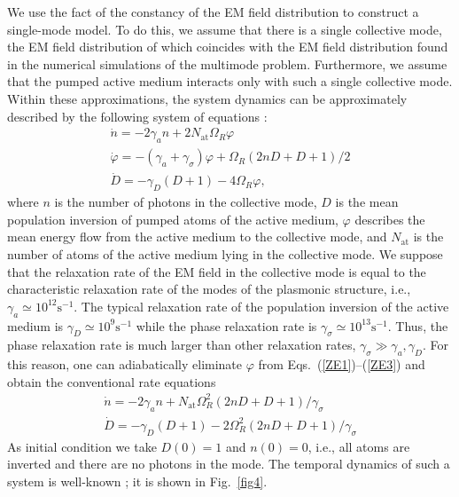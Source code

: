 \documentclass[aps,pra,amsmath,amssymb,onecolumn,superscriptaddress,showpacs,floatfix,]{revtex4-1}
\begin{document}
We use the fact of the constancy of the EM field distribution to construct a single-mode model. To do this, we assume that there is a single collective mode, the EM field distribution of which coincides with the EM field distribution found in the numerical simulations of the multimode problem. Furthermore, we assume that the pumped active medium interacts only with such a single collective mode. Within these approximations, the system dynamics can be approximately described by the following system of equations \cite{SiegmanLasers}:
\begin{gather} 
\dot n =  - 2{\gamma _a}n + 2{N_{\text{at}}}{\Omega _R}\varphi \label{ZE1}
\\
\dot \varphi = - \left( {{\gamma _a} + {\gamma _\sigma }} \right)\varphi + {\Omega _R}\left( {2nD + D + 1} \right)/2 \label{ZE2}
\\
\dot D =  - {\gamma _D}\left( {D + 1} \right) - 4{\Omega _R}\varphi, \label{ZE3}
\end{gather}
where $n$ is the number of photons in the collective mode, $D$ is the mean population inversion of pumped atoms of the active medium, $\varphi$ describes the mean energy flow from the active medium to the collective mode, and $N_{\text{at}}$ is the number of atoms of the active medium lying in the collective mode.
We suppose that the relaxation rate of the EM field in the collective mode is equal to the characteristic relaxation rate of the modes of the plasmonic structure, i.e., $\gamma_a \simeq 10^{12} \text{s}^{-1}$.
The typical relaxation rate of the population inversion of the active medium is $\gamma_D \simeq 10^9 \text{s}^{-1}$ while the phase relaxation rate is $\gamma_{\sigma}\simeq 10^{13} \text{s}^{-1}$.
Thus, the phase relaxation rate is much larger than other relaxation rates, $\gamma_\sigma \gg \gamma_a, \gamma_D$.
For this reason, one can adiabatically eliminate $\varphi$ from Eqs.~(\ref{ZE1})--(\ref{ZE3}) and obtain the conventional rate equations
\begin{gather} 
\dot n =  - 2 {\gamma _a}n + {N_{\text{at}}}\Omega _R^2\left( {2nD + D + 1} \right)/{\gamma _\sigma } \label{RE1}
\\
\dot D =  - {\gamma _D}\left( {D + 1} \right) - 2\Omega _R^2\left( {2nD + D + 1} \right)/{\gamma _\sigma } \label{RE2}
\end{gather}
As initial condition we take $D(0) = 1$ and $n(0) = 0$, i.e., all atoms are inverted and there are no photons in the mode.
The temporal dynamics of such a system is well-known \cite{SiegmanLasers}; it is shown in Fig.~\ref{fig4}.
\end{document}

